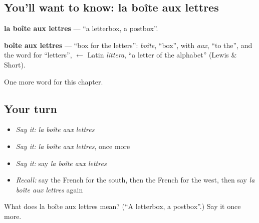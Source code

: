 \subsection*{You'll want to know: la boîte aux lettres}
\textbf{la boîte aux lettres} — \textquotedblleft{}a letterbox, a postbox\textquotedblright{}.

\begin{cousinweb}
\textbf{boîte aux lettres} — \textquotedblleft{}box for the letters\textquotedblright{}: \emph{boîte}, \textquotedblleft{}box\textquotedblright{}, with \emph{aux}, \textquotedblleft{}to the\textquotedblright{}, and the word for \textquotedblleft{}letters\textquotedblright{}, $\leftarrow$ Latin \emph{littera}, \textquotedblleft{}a letter of the alphabet\textquotedblright{} (Lewis \& Short).
\end{cousinweb}

\begin{grammarlens}[title={What you've built}]
One more word for this chapter.
\end{grammarlens}

\subsection*{Your turn}
\begin{itemize}
\raggedright
  \item \emph{Say it:} \emph{la boîte aux lettres}
  \item \emph{Say it:} \emph{la boîte aux lettres}, once more
  \item \emph{Say it:} say \emph{la boîte aux lettres}
  \item \emph{Recall:} say the French for the south, then the French for the west, then say \emph{la boîte aux lettres} again
\end{itemize}

\begin{tcolorbox}[breakable,colback=teal!4,colframe=teal!35!black,title={Before you move on}]
What does la boîte aux lettres mean? (\textquotedblleft{}A letterbox, a postbox\textquotedblright{}.) Say it once more.
\end{tcolorbox}
